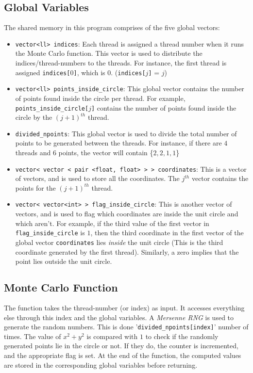 \documentclass[12pt]{article}
\begin{document}
\subsection{Global Variables}
The shared memory in this program comprises of the five global vectors:
\begin{itemize}
  \item \texttt{vector<ll> indices}: Each thread is assigned a thread number when it runs the Monte Carlo function. This vector is used to distribute
  the indices/thread-numbers to the threads. For instance, the first thread is assigned \texttt{indices[$0$]}, which is $0$. (\texttt{indices[$j$]} = $j$)
  \item \texttt{vector<ll> points\_inside\_circle}: This global vector contains the number of points found inside the circle per thread. For example, \texttt{points\_inside\_circle[$j$]} contains the 
  number of points found inside the circle by the $(j+1)^{th}$ thread.
  \item \texttt{divided\_npoints}: This global vector is used to divide the total number of points to be generated between the threads. For instance, if there are $4$ threads and $6$ points, the vector will contain \{$2,2,1,1$\}
  \item \texttt{vector< vector < pair <float, float> > > coordinates}: This is a vector of vectors, and is used to store all the coordinates. The $j^{th}$ vector contains the points for the $(j+1)^{th}$ thread.
  \item \texttt{vector< vector<int> > flag\_inside\_circle}: This is another vector of vectors, and is used to flag which coordinates are inside the unit circle and which aren't. For example, if the third value of the first vector in \texttt{flag\_inside\_circle} is $1$,
  then the third coordinate in the first vector of the global vector \texttt{coordinates} lies \emph{inside} the unit circle (This is the third coordinate generated by the first thread). Similarly, a zero implies that the point lies outside the unit circle.
\end{itemize}

\subsection{Monte Carlo Function}
The function takes the thread-number (or index) as input. It accesses everything else through this index and the global variables. A \emph{Mersenne RNG} is used to generate the random numbers. This is done '\texttt{divided\_npoints[index]}' number of times. The value of $x^2 + y^2$ is compared
with $1$ to check if the randomly generated points lie in the circle or not. If they do, the counter is incremented, and the appropriate flag is set. At the end of the function, the computed values are stored in the corresponding global variables before returning.
\end{document}
